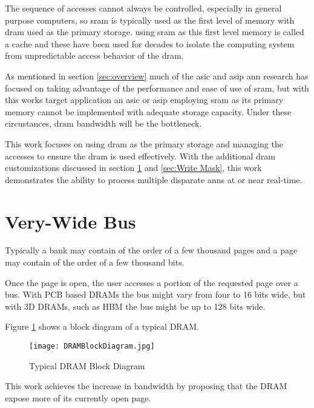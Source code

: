 The sequence of accesses cannot always be controlled, especially in general purpose computers, so \ac{sram} is typically used as the first level of memory with \ac{dram} used as the primary storage. 
using \ac{sram} as this first level memory is called a cache and these have been used for decades to isolate the computing system from unpredictable access behavior of the \ac{dram}.

As mentioned in section \ref{sec:overview} much of the \ac{asic} and \ac{asip} \ac{ann} research has focused on taking advantage of the performance and ease of use of \ac{sram}, but with this works target application an \ac{asic} or \ac{asip} employing \ac{sram} as its primary memory cannot be implemented with adequate storage capacity.
Under these circustances, \ac{dram} bandwidth will be the bottleneck.

This work focuses on using \ac{dram} as the primary storage and managing the accesses to ensure the \ac{dram} is used effectively. With the additional \ac{dram} customizations discussed in section \ref{sec:Very-Wide Bus} and \ref{sec:Write Mask}, this work demonstrates the ability to process multiple disparate \acp{ann} at or near real-time.


\section{Very-Wide Bus}
\label{sec:Very-Wide Bus}

Typically a bank may contain of the order of a few thousand pages and a page may contain of the order of a few thousand bits.

Once the page is open, the user accesses a portion of the requested page over a bus. With PCB based DRAMs the bus might vary from four to 16 bits wide, but with 3D DRAMs, such as HBM the bus might be up to 128 bits wide.

Figure \ref{fig:dramBlockDiagram} shows a block diagram of a typical DRAM.

\begin{figure}[!t]
\centering
\captionsetup{justification=centering}
\centerline{
\mbox{\texttt{[image: DRAMBlockDiagram.jpg]}}
}
\caption{Typical DRAM Block Diagram}
\label{fig:dramBlockDiagram}
\end{figure}

This work achieves the increase in bandwidth by proposing that the DRAM expose more of its currently open page.

